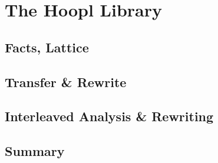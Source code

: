 \documentclass[12pt]{report}
\begin{document}

\chapter{The Hoopl Library}



\section{Facts, Lattice}

\section{Transfer \& Rewrite}

\section{Interleaved Analysis \& Rewriting}

\section{Summary}
\end{document}
